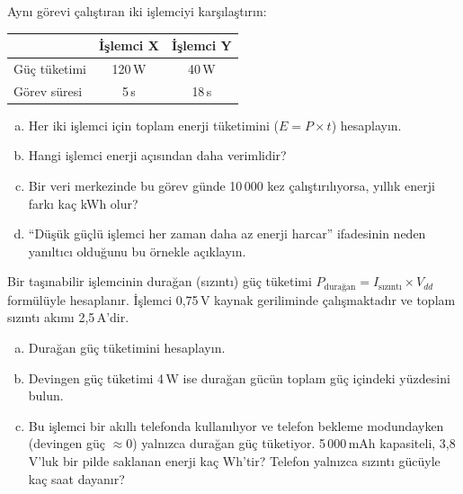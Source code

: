 \begin{alistirma}[\zor]
Aynı görevi çalıştıran iki işlemciyi karşılaştırın:

\smallskip
\begin{tabular}{@{}lcc@{}}
\toprule
 & \textbf{İşlemci X} & \textbf{İşlemci Y} \\
\midrule
Güç tüketimi & 120\,W & 40\,W \\
Görev süresi & 5\,s & 18\,s \\
\bottomrule
\end{tabular}
\smallskip

\begin{enumerate}[(a)]
    \item Her iki işlemci için toplam enerji tüketimini ($E = P \times t$) hesaplayın.
    \item Hangi işlemci enerji açısından daha verimlidir?
    \item Bir veri merkezinde bu görev günde 10\,000 kez çalıştırılıyorsa, yıllık enerji farkı kaç kWh olur?
    \item ``Düşük güçlü işlemci her zaman daha az enerji harcar'' ifadesinin neden yanıltıcı olduğunu bu örnekle açıklayın.
\end{enumerate}
\end{alistirma}

\begin{alistirma}[\orta]
Bir taşınabilir işlemcinin durağan (sızıntı) güç tüketimi $P_{\text{durağan}} = I_{\text{sızıntı}} \times V_{dd}$ formülüyle hesaplanır. İşlemci 0{,}75\,V kaynak geriliminde çalışmaktadır ve toplam sızıntı akımı 2{,}5\,A'dir.
\begin{enumerate}[(a)]
    \item Durağan güç tüketimini hesaplayın.
    \item Devingen güç tüketimi 4\,W ise durağan gücün toplam güç içindeki yüzdesini bulun.
    \item Bu işlemci bir akıllı telefonda kullanılıyor ve telefon bekleme modundayken (devingen güç $\approx 0$) yalnızca durağan güç tüketiyor. 5\,000\,mAh kapasiteli, 3{,}8\,V'luk bir pilde saklanan enerji kaç Wh'tir? Telefon yalnızca sızıntı gücüyle kaç saat dayanır?
\end{enumerate}
\end{alistirma}



